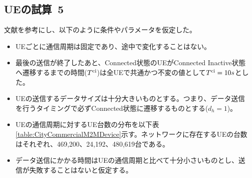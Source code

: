 \documentclass[a4j]{ujarticle}
\begin{document}
\subsection{UEの試算~5}
\label{sec:estimate5}
文献\cite{Machine-to-MachineCommunicationsArchitecturesTechnologyStandardsandApplications}を参考にし、以下のように条件やパラメータを仮定した。
\begin{itemize}
  \item UEごとに通信周期は固定であり、途中で変化することはない。
  \item 最後の送信が終了したあと、Connected状態のUEがConnected Inactive状態へ遷移するまでの時間($T^{\rm ci}$)は全UEで共通かつ不変の値として$T^{\rm ci} = 10s$とした。
  \item UEの送信するデータサイズは十分大きいものとする。つまり、データ送信を行うタイミングで必ずConnected状態に遷移するものとする($d_h = 1$)。
  \item UEの通信周期に対するUE台数の分布を以下表\ref{table:CityCommercialM2MDevice}示す。ネットワークに存在するUEの台数はそれぞれ、469,200、24,192、480,619台である。
  \item データ送信にかかる時間はUEの通信周期と比べて十分小さいものとし、送信が失敗することはないと仮定する。
\end{itemize}
\end{document}
